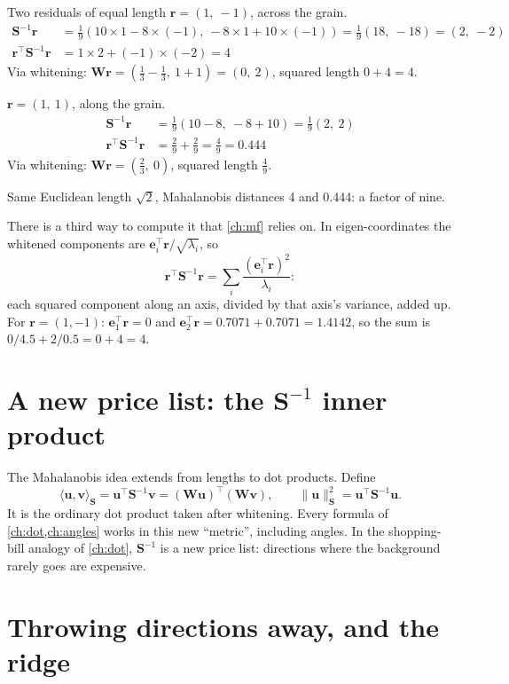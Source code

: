 \documentclass[11pt,a4paper,oneside,openany]{book}
\newcommand{\B}[1]{{\symbf{#1}}}
\newcommand{\B}[1]{{\bm{#1}}}
\newcommand{\T}{^{\top}}
\newcommand{\nrm}[1]{\lVert #1\rVert}
\newcommand{\vr}{\B{r}}
\newcommand{\ve}{\B{e}}
\newcommand{\vu}{\B{u}}
\newcommand{\vv}{\B{v}}
\newcommand{\mS}{\B{S}}
\newcommand{\mW}{\B{W}}
\begin{document}
\begin{worked}[label=we:maha]{Two residuals of equal length}
$\vr=(1,\ -1)$, across the grain.
\begin{align*}
\mS^{-1}\vr &= \tfrac19(10\times1-8\times(-1),\ -8\times1+10\times(-1))=\tfrac19(18,\ -18)=(2,\ -2)\\
\vr\T\mS^{-1}\vr &= 1\times2+(-1)\times(-2)=4
\end{align*}
Via whitening: $\mW\vr=(\frac13-\frac13,\ 1+1)=(0,\ 2)$, squared length $0+4=4$.

$\vr=(1,\ 1)$, along the grain.
\begin{align*}
\mS^{-1}\vr &= \tfrac19(10-8,\ -8+10)=\tfrac19(2,\ 2)\\
\vr\T\mS^{-1}\vr &= \tfrac29+\tfrac29=\tfrac49=0.444
\end{align*}
Via whitening: $\mW\vr=(\frac23,\ 0)$, squared length $\frac49$.

Same Euclidean length $\sqrt2$, Mahalanobis distances 4 and 0.444: a factor of nine.
\end{worked}

There is a third way to compute it that \cref{ch:mf} relies on. In eigen-coordinates the whitened components are
$\ve_i\T\vr/\sqrt{\lambda_i}$, so
\[
  \vr\T\mS^{-1}\vr=\sum_i\frac{(\ve_i\T\vr)^2}{\lambda_i}:
\]
each squared component along an axis, divided by that axis's variance, added up. For $\vr=(1,-1)$: $\ve_1\T\vr=0$ and
$\ve_2\T\vr=0.7071+0.7071=1.4142$, so the sum is $0/4.5+2/0.5=0+4=4$.

\section{\texorpdfstring{A new price list: the $\mS^{-1}$ inner product}{A new price list: the inverse-covariance inner product}}

The Mahalanobis idea extends from lengths to dot products. Define
\[
  \langle\vu,\vv\rangle_{\mS}=\vu\T\mS^{-1}\vv=(\mW\vu)\T(\mW\vv),\qquad \nrm{\vu}^2_{\mS}=\vu\T\mS^{-1}\vu .
\]
It is the ordinary dot product taken after whitening. Every formula of \cref{ch:dot,ch:angles} works in this new
``metric'', including angles. In the shopping-bill analogy of \cref{ch:dot}, $\mS^{-1}$ is a new price list: directions where
the background rarely goes are expensive.

\section{Throwing directions away, and the ridge}
\end{document}
